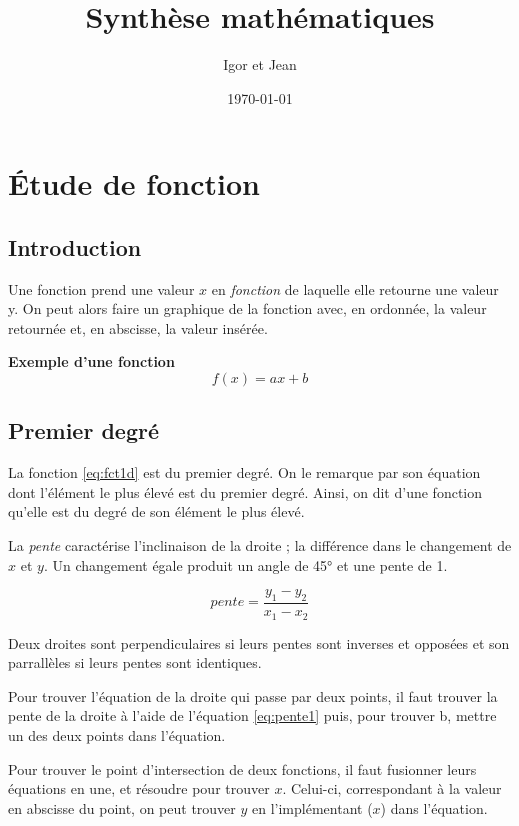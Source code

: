 \documentclass[a4paper]{article}
\author{Igor et Jean}
\date{\today}
\title{Synthèse mathématiques}
\begin{document}
    \maketitle
    \tableofcontents
    \section{Étude de fonction}

    \subsection{Introduction}
    Une fonction prend une valeur $x$ en \emph{fonction} de laquelle elle
    retourne une valeur y. On peut alors faire un graphique de la fonction avec,
    en ordonnée, la valeur retournée et, en abscisse, la valeur insérée. 

    \textbf{Exemple d'une fonction}
    \begin{equation}\label{eq:fct1d}
       f(x) = ax + b 
    \end{equation}

    \subsection{Premier degré}\label{ss:pd}
    La fonction \ref{eq:fct1d} est du premier degré. On le remarque par son
    équation dont l'élément le plus élevé est du premier degré. Ainsi, on dit
    d'une fonction qu'elle est du degré de son élément le plus élevé.

    La \emph{pente} caractérise l'inclinaison de la droite ; la différence dans
    le changement de $x$ et $y$. Un changement égale produit un angle de 45° et
    une pente de 1.

    \begin{equation}\label{eq:pente1}
        pente = \frac{y_1 - y_2}{x_1 - x_2}
    \end{equation}

    Deux droites sont perpendiculaires si leurs pentes sont inverses et opposées
    et son parrallèles si leurs pentes sont identiques.

    Pour trouver l'équation de la droite qui passe par deux points, il faut
    trouver la pente de la droite à l'aide de l'équation \ref{eq:pente1} puis,
    pour trouver b, mettre un des deux points dans l'équation.

    Pour trouver le point d'intersection de deux fonctions, il faut fusionner
    leurs équations en une, et résoudre pour trouver $x$.  Celui-ci,
    correspondant à la valeur en abscisse du point, on peut trouver $y$ en
    l'implémentant ($x$) dans l'équation.
    
\end{document}
